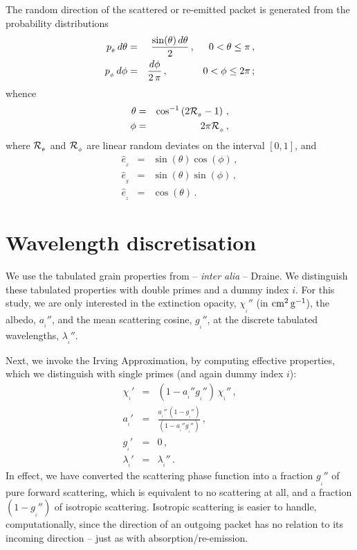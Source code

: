 \documentclass[usenatbib]{mn2e}
\numberwithin{equation}{section}
\begin{document}
The random direction of the scattered or re-emitted packet is generated from the probability distributions 
\begin{eqnarray}
p_{_\theta}\,d\theta&=&\frac{\sin(\theta)\,d\theta}{2}\,,\hspace{0.5cm}0<\theta\leq\pi\,,\\
p_{_\phi}\,d\phi&=&\frac{d\phi}{2\,\pi}\,,\hspace{1.27cm}0<\phi\leq 2\pi\,;
\end{eqnarray}
whence 
\begin{eqnarray}
\theta&=&\cos^{-1}\left(2{\cal R}_{_\theta}-1\right)\,,\\
\phi&=&2\pi {\cal R}_{_\phi}\,,
\end{eqnarray}
where ${\cal R}_{_\theta}$ and ${\cal R}_{_\phi}$ are linear random deviates on the interval $[0,1]$, and
\begin{eqnarray}
{\hat e}_{_x}&=&\sin(\theta)\cos(\phi)\,,\\
{\hat e}_{_y}&=&\sin(\theta)\sin(\phi)\,,\\
{\hat e}_{_z}&=&\cos(\theta)\,.
\end{eqnarray}





\section{Wavelength discretisation}\label{APP:WavelengthDiscretisation}

We use the tabulated grain properties from -- {\it inter alia} -- Draine. We distinguish these tabulated properties with double primes and a dummy index $i$. For this study, we are only interested in the extinction opacity, $\chi_{_i}''$ (in ${\rm cm}^2\,{\rm g}^{-1}$), the albedo, $a_{_i}''$, and the mean scattering cosine, $g_{_i}''$, at the discrete tabulated wavelengths, $\lambda_{_i}''$.

Next, we invoke the Irving Approximation, by computing effective properties, which we distinguish with single primes (and again dummy index $i$):
\begin{eqnarray}
\chi_{_i}'&=&(1-a_{_i}''g_{_i}'')\,\chi_{_i}''\,,\\
a_{_i}'&=&\frac{a_{_i}''\,(1-g_{_i}'')}{(1-a_{_i}''g_{_i}'')}\,,\\
g_{_i}'&=&0\,,\\
\lambda_{_i}'&=&\lambda_{_i}''\,.
\end{eqnarray}
In effect, we have converted the scattering phase function into a fraction $g_{_i}''$ of pure forward scattering, which is equivalent to no scattering at all, and a fraction $(1-g_{_i}'')$ of isotropic scattering. Isotropic scattering is easier to handle, computationally, since the direction of an outgoing packet has no relation to its incoming direction -- just as with absorption/re-emission.
\end{document}
